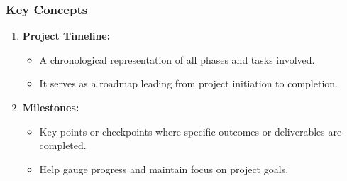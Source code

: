 \documentclass[aspectratio=169]{beamer}
\begin{document}
\begin{frame}[fragile]
    \frametitle{Key Concepts}
    \begin{enumerate}
        \item \textbf{Project Timeline:}
        \begin{itemize}
            \item A chronological representation of all phases and tasks involved.
            \item It serves as a roadmap leading from project initiation to completion.
        \end{itemize}
        
        \item \textbf{Milestones:}
        \begin{itemize}
            \item Key points or checkpoints where specific outcomes or deliverables are completed.
            \item Help gauge progress and maintain focus on project goals.
        \end{itemize}
    \end{enumerate}
\end{frame}
\end{document}
